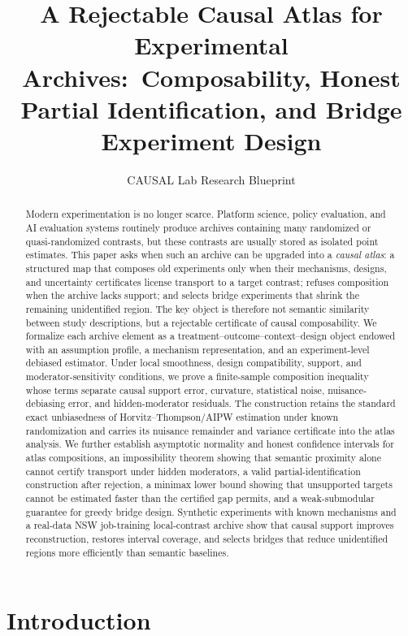 \documentclass[11pt]{article}
\title{A Rejectable Causal Atlas for Experimental Archives:\ Composability, Honest Partial Identification, and Bridge Experiment Design}
\author{CAUSAL Lab Research Blueprint}
\date{}
\numberwithin{equation}{section}
\newcommand{\1}{\mathbf 1}
\begin{document}
\maketitle

\begin{abstract}
Modern experimentation is no longer scarce.  Platform science, policy evaluation, and AI evaluation systems routinely produce archives containing many randomized or quasi-randomized contrasts, but these contrasts are usually stored as isolated point estimates.  This paper asks when such an archive can be upgraded into a \emph{causal atlas}: a structured map that composes old experiments only when their mechanisms, designs, and uncertainty certificates license transport to a target contrast; refuses composition when the archive lacks support; and selects bridge experiments that shrink the remaining unidentified region.  The key object is therefore not semantic similarity between study descriptions, but a rejectable certificate of causal composability.  We formalize each archive element as a treatment--outcome--context--design object endowed with an assumption profile, a mechanism representation, and an experiment-level debiased estimator.  Under local smoothness, design compatibility, support, and moderator-sensitivity conditions, we prove a finite-sample composition inequality whose terms separate causal support error, curvature, statistical noise, nuisance-debiasing error, and hidden-moderator residuals.  The construction retains the standard exact unbiasedness of Horvitz--Thompson/AIPW estimation under known randomization and carries its nuisance remainder and variance certificate into the atlas analysis.  We further establish asymptotic normality and honest confidence intervals for atlas compositions, an impossibility theorem showing that semantic proximity alone cannot certify transport under hidden moderators, a valid partial-identification construction after rejection, a minimax lower bound showing that unsupported targets cannot be estimated faster than the certified gap permits, and a weak-submodular guarantee for greedy bridge design.  Synthetic experiments with known mechanisms and a real-data NSW job-training local-contrast archive show that causal support improves reconstruction, restores interval coverage, and selects bridges that reduce unidentified regions more efficiently than semantic baselines.
\end{abstract}

\section{Introduction}
\label{sec:introduction}
\end{document}
